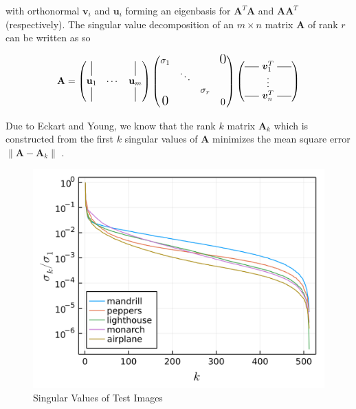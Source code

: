\documentclass[conference]{IEEEtran}
\newcommand*{\vertbar}{\rule[-1ex]{0.5pt}{1.5em}}
\newcommand*{\horzbar}{\rule[0.5ex]{1.5em}{0.5pt}}
\begin{document}
with orthonormal $\mathbf{v}_i$ and $\mathbf{u}_i$ forming an eigenbasis for $\mathbf{A}^T\mathbf{A}$ and $\mathbf{AA}^T$ (respectively).
The singular value decomposition of an $m\times n$ matrix $\mathbf{A}$ of rank $r$ can be written as so

\begin{equation}
    \mathbf{A} = 
    \begin{pmatrix}
        \vertbar && \vertbar \\
        \mathbf{u}_1 & \cdots & \mathbf{u}_m \\
        \vertbar && \vertbar \\
    \end{pmatrix}
    \begin{pmatrix}
        \sigma_1 &&&\text{\Large0} \\ 
        & \ddots && \\
        && \sigma_r & \\
        \text{\Large0}&&& 0 \\
    \end{pmatrix}
    \begin{pmatrix}\horzbar~\bm{v}^T_1~\horzbar\\\vdots\\\horzbar~\bm{v}^T_n~\horzbar\end{pmatrix}
\end{equation}

Due to Eckart and Young, we know that the rank $k$ matrix $\mathbf{A}_k$ which is constructed from the first $k$ singular values of $\mathbf{A}$ minimizes the mean square error $\left\lVert\mathbf{A}-\mathbf{A}_k\right\rVert$ \cite{strang}.

\begin{figure}[htbp]
    \centering
    \includegraphics[width=0.7\columnwidth]{images/mandrill_SVD.png}
    \caption{Singular Values of Test Images}
    \label{fig:svd}
\end{figure}
\end{document}
